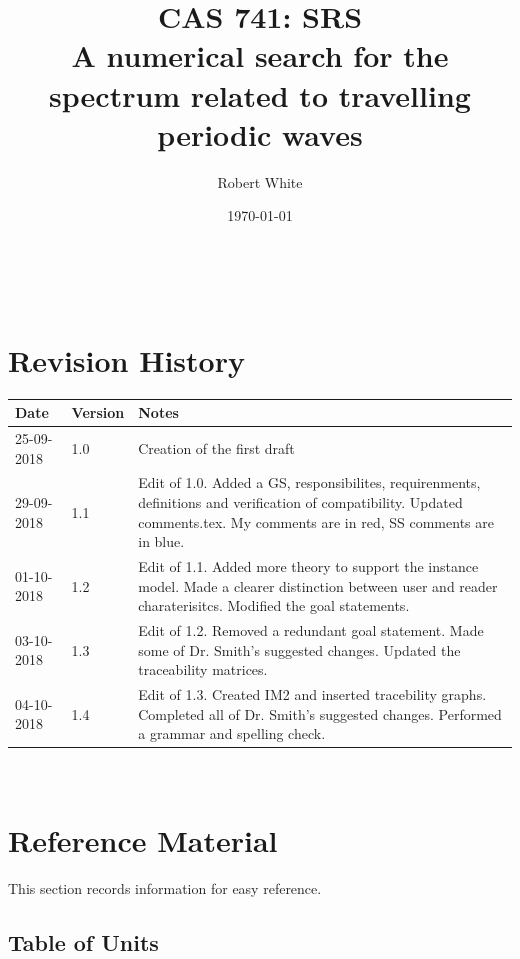 \documentclass[12pt]{article}
\begin{document}
\title{CAS 741: SRS \\A numerical search for the spectrum related to travelling 
periodic waves} 
\author{Robert White}
\date{\today}
	
\maketitle

~\newpage


\section{Revision History}

\begin{tabularx}{\textwidth}{p{3cm}p{2cm}X}
\toprule {\bf Date} & {\bf Version} & {\bf Notes}\\
\midrule
25-09-2018 & 1.0 & Creation of the first draft\\
29-09-2018 & 1.1 & Edit of 1.0. Added a GS, responsibilites, requirenments, 
definitions and verification of compatibility. Updated comments.tex. My 
comments are in red, SS comments are in blue.\\ 
01-10-2018 & 1.2 & Edit of 1.1. Added more theory to support the instance 
model. Made a clearer distinction between user and reader charaterisitcs. 
Modified the goal statements.  \\ 
03-10-2018 & 1.3 & Edit of 1.2. Removed a redundant goal statement. Made some 
of Dr. 
Smith's suggested changes. Updated the traceability matrices.  \\
04-10-2018 & 1.4 & Edit of 1.3. Created IM2 and inserted tracebility graphs. 
Completed all of Dr. Smith's suggested changes. Performed a grammar and 
spelling check.\\
\bottomrule
\end{tabularx}

~\newpage

\section{Reference Material}

This section records information for easy reference.

\subsection{Table of Units}
\end{document}
